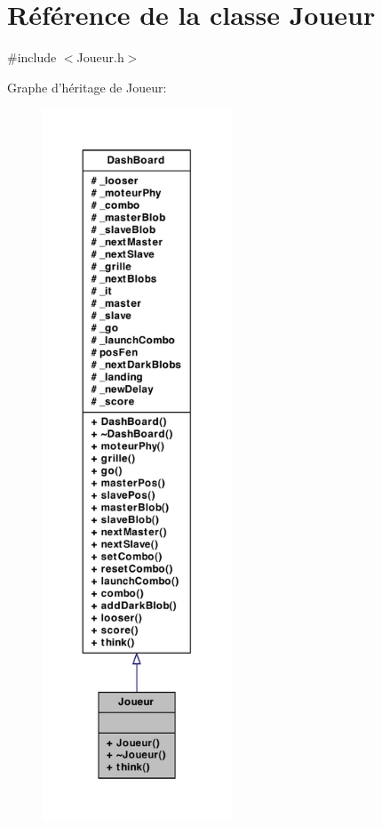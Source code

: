\hypertarget{a00012}{
\section{Référence de la classe Joueur}
\label{a00012}
}


{\ttfamily \#include $<$Joueur.h$>$}



Graphe d'héritage de Joueur:
\nopagebreak
\begin{figure}[H]
\begin{center}
\leavevmode
\includegraphics[height=600pt]{a00091}
\end{center}
\end{figure}


